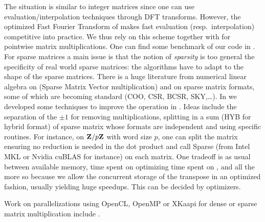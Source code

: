 %
%
The situation is similar to integer matrices since one can use
evaluation/interpolation techniques through DFT transforms. However, the
optimized Fast Fourier Transform of \cite{Harvey:2014}  makes fast evaluation
(resp.\ interpolation) competitive into practice. We thus rely on this scheme
together with \fgemm for pointwise matrix multiplications. One can find some
benchmark of our code in \cite{GioLeb14}.
%
%
For sparse matrices a main issue is that the notion of \emph{sparsity}
is too general \vs the specificity of real world sparse matrices: the
algorithms have to adapt to the shape of the sparse matrices.
%
There is a huge literature from numerical linear algebra  on \spmv (Sparse
Matrix Vector multiplication) and on sparse matrix formats, some of which are
becoming standard (COO, CSR, BCSR, SKY,\ldots).  In \cite{Boyer:2010:spmv} we
developed some techniques to improve the \spmv operation in \linbox. Ideas
include the separation of the $\pm 1$ for removing multiplications, splitting
in a sum (HYB for hybrid format) of sparse matrix  whose formats are
independent and using specific routines. For instance, on $\mathbf{Z}{/ p\mathbf{Z}}$ with
word size $p$, one can split the matrix ensuring no reduction is needed  in the
dot product and call Sparse \blas (from Intel \textsf{MKL} or Nvidia
\textsf{cuBLAS} for instance) on each matrix. One tradeoff is as usual between
available memory, time spent on optimizing \vs time spent on \apply, and all
the more so because we allow the concurrent storage of the transpose in an
optimized fashion, usually yielding huge speedups. This can be decided by
\adhoc optimizers.
%
\par
Work on parallelizations using \textsf{OpenCL}, \textsf{OpenMP} or
\textsf{XKaapi} for dense or sparse matrix multiplication include
\cite{Boyer:2010:spmv,WST12,DGPZ14}.
